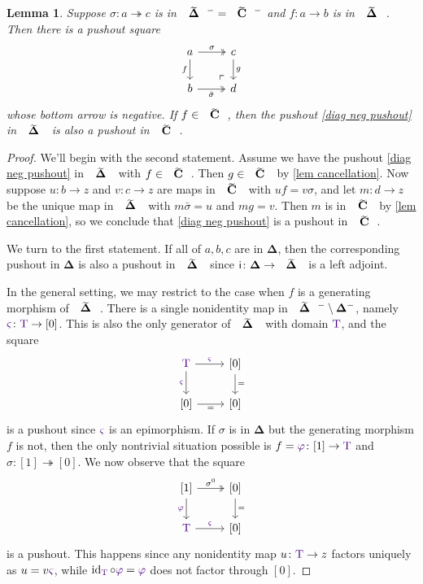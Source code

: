 \documentclass{amsart}
\makeatletter
\newcommand{\contr}{\mathbf{C}}
\newcommand{\simpl}{\mathbf{\Delta}}
\DeclareMathOperator{\id}{id}
\newcommand*\wt[1]{\mathpalette\wthelper{#1}}
\newcommand*\wthelper[2]{%
        \hbox{\dimen@\accentfontxheight#1%
                \accentfontxheight#11.3\dimen@
                $\m@th#1\widetilde{#2}$%
                \accentfontxheight#1\dimen@
        }%
}
\newcommand*\accentfontxheight[1]{%
        \fontdimen5\ifx#1\displaystyle
                \textfont
        \else\ifx#1\textstyle
                \textfont
        \else\ifx#1\scriptstyle
                \scriptfont
        \else
                \scriptscriptfont
        \fi\fi\fi3
}
\newcommand{\Tsimpl}{\wt\simpl}
\newcommand{\Tcontr}{\wt\contr}
\newcommand{\Tob}{\textup{\color{Indigo}T}}
\newcommand{\sigr}{{\color{Indigo}\varphi}}
\newcommand{\sigl}{{\color{Indigo}\varsigma}}
\newcommand{\lili}{\mathsf{i}}
\newtheorem{lemma}[theorem]{Lemma}
\theoremstyle{definition}
\theoremstyle{noname}
\makeatother
\begin{document}
\begin{lemma}\label{lem pushout stability negative}
Suppose $\sigma \colon a \twoheadrightarrow c$ is in $\Tsimpl^- = \Tcontr^-$ and $f\colon a \to b$ is in $\Tsimpl$.
Then there is a pushout square
\begin{equation}\label{diag neg pushout}
\begin{tikzcd}
a \rar[two heads, "\sigma"] \dar[swap]{f} \drar[phantom, "\ulcorner"very near end] & c \dar{g} \\
b \rar[two heads, "\bar \sigma"'] & d
\end{tikzcd}
\end{equation}
whose bottom arrow is negative.
If $f\in \Tcontr$, then the pushout \eqref{diag neg pushout} in $\Tsimpl$ is also a pushout in $\Tcontr$.
\end{lemma}
\begin{proof}
We'll begin with the second statement.
Assume we have the pushout \eqref{diag neg pushout} in $\Tsimpl$ with $f\in \Tcontr$.
Then $g\in \Tcontr$ by \cref{lem cancellation}.
Now suppose $u\colon b \to z$ and $v\colon c \to z$ are maps in $\Tcontr$ with $uf = v\sigma$, and let $m\colon d \to z$ be the unique map in $\Tsimpl$ with $m\bar\sigma = u$ and $mg = v$.
Then $m$ is in $\Tcontr$ by \cref{lem cancellation}, so we conclude that \eqref{diag neg pushout} is a pushout in $\Tcontr$.

We turn to the first statement. 
If all of $a,b,c$ are in $\simpl$, then the corresponding pushout in $\simpl$ is also a pushout in $\Tsimpl$ since $\lili \colon \simpl \to \Tsimpl$ is a left adjoint.

In the general setting, we may restrict to the case when $f$ is a generating morphism of $\Tsimpl$.
There is a single nonidentity map in $\Tsimpl^- \setminus \simpl^-$, namely $\sigl \colon \Tob \to [0]$.
This is also the only generator of $\Tsimpl$ with domain $\Tob$, and the square
\[ \begin{tikzcd}
\Tob \rar{\sigl} \dar[swap]{\sigl} & {[0]} \dar{=}  \\
{[0]} \rar[swap]{=} & {[0]}
\end{tikzcd} \]
is a pushout since $\sigl$ is an epimorphism.
If $\sigma$ is in $\simpl$ but the generating morphism $f$ is not, then the only nontrivial situation possible is $f=\sigr \colon [1] \to \Tob$ and $\sigma \colon [1] \twoheadrightarrow [0]$.
We now observe that the square
\begin{equation}\label{diag grounded pushout}
\begin{tikzcd}
{[1]} \dar[swap]{\sigr} \rar[two heads,"\sigma^0"] & {[0]} \dar{=} \\
\Tob \rar{\sigl} & {[0]}
\end{tikzcd} 
\end{equation}
is a pushout.
This happens since any nonidentity map $u \colon \Tob \to z$ factors uniquely as $u = v\sigl$, while $\id_\Tob \circ \sigr = \sigr$ does not factor through $[0]$.
\end{proof}
\end{document}
